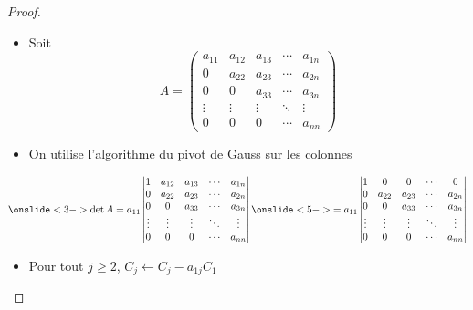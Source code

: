 \begin{frame}
\begin{proof}

\begin{itemize}
\item Soit 
$$A=\begin{pmatrix}
{a_{11}}&a_{12}&a_{13}&\cdots&a_{1n}\\
0&{a_{22}}&a_{23}&\cdots&a_{2n}\\
0&0&{a_{33}}&\cdots&a_{3n}\\
\vdots&\vdots&\vdots&\ddots&\vdots\\
0&0&0&\cdots&{a_{nn}}
\end{pmatrix}
$$

  \item\pause On utilise l'algorithme du pivot de Gauss sur les colonnes
\end{itemize} 

$$
\onslide<3->
\det A=a_{11}\left|\begin{matrix}
1&a_{12}&a_{13}&\cdots&a_{1n}\\
0&{a_{22}}&a_{23}&\cdots&a_{2n}\\
0&0&{a_{33}}&\cdots&a_{3n}\\
\vdots&\vdots&\vdots&\ddots&\vdots\\
0&0&0&\cdots&{a_{nn}}
\end{matrix}\right|
\onslide<5->{
=
a_{11}\left|\begin{matrix}
1&0&0&\cdots&0\\
0&{a_{22}}&a_{23}&\cdots&a_{2n}\\
0&0&{a_{33}}&\cdots&a_{3n}\\
\vdots&\vdots&\vdots&\ddots&\vdots\\
0&0&0&\cdots&{a_{nn}}
\end{matrix}\right| 
}$$

\begin{itemize}  
  \item<4-> Pour tout $j \geq 2$, $C_j \leftarrow C_j - a_{1j}C_1$
\end{itemize}  
\vspace*{-3ex}
\noqed
\end{proof} 
\end{frame}



